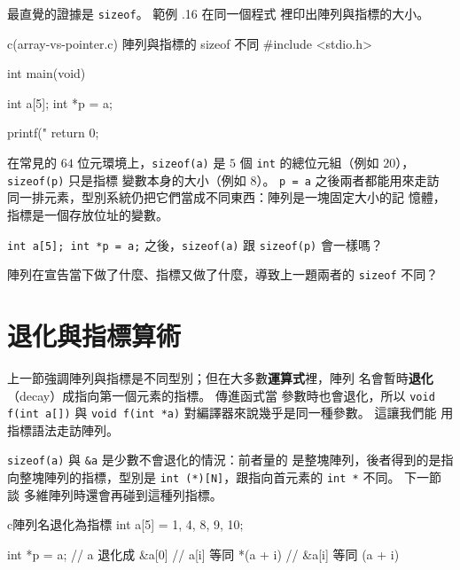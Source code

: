 最直覺的證據是 \texttt{sizeof}。 範例 \thechapter.16 在同一個程式
裡印出陣列與指標的大小。

\begin{example}{c}{(array-vs-pointer.c) 陣列與指標的 sizeof 不同}
#include <stdio.h>

int main(void) {
    int a[5];
    int *p = a;

    printf("%
    return 0;
}
\end{example}


在常見的 $64$ 位元環境上，\texttt{sizeof(a)} 是 $5$ 個
\texttt{int} 的總位元組（例如 $20$），\texttt{sizeof(p)} 只是指標
變數本身的大小（例如 $8$）。 \texttt{p = a} 之後兩者都能用來走訪
同一排元素，型別系統仍把它們當成不同東西：陣列是一塊固定大小的記
憶體，指標是一個存放位址的變數。


\begin{drills}[label=drills:ptr-array-vs-pointer]
\item \texttt{int a[5]; int *p = a;} 之後，\texttt{sizeof(a)} 跟
\texttt{sizeof(p)} 會一樣嗎？
\item 陣列在宣告當下做了什麼、指標又做了什麼，導致上一題兩者的
\texttt{sizeof} 不同？
\end{drills}

\section{退化與指標算術}
\label{sec:ptr-decay-arith}

上一節強調陣列與指標是不同型別；但在大多數\textbf{運算式}裡，陣列
名會暫時\textbf{退化}（decay）成指向第一個元素的指標。 傳進函式當
參數時也會退化，所以 \texttt{void f(int a[])} 與
\texttt{void f(int *a)} 對編譯器來說幾乎是同一種參數。 這讓我們能
用指標語法走訪陣列。

\texttt{sizeof(a)} 與 \texttt{\&a} 是少數不會退化的情況：前者量的
是整塊陣列，後者得到的是指向整塊陣列的指標，型別是
\texttt{int (*)[N]}，跟指向首元素的 \texttt{int *} 不同。 下一節談
多維陣列時還會再碰到這種列指標。

\begin{code}{c}{陣列名退化為指標}
int a[5] = {1, 4, 8, 9, 10};

int *p = a;           // a 退化成 &a[0]
// a[i]   等同 *(a + i)
// &a[i]  等同 (a + i)
\end{code}

